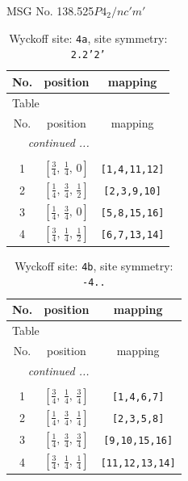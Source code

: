 \documentclass[fleqn,8pt]{jsarticle}
\begin{document}
\setcounter{MaxMatrixCols}{32}

\renewcommand{\tablename}{Table~}
\renewcommand{\figurename}{Figure~}
\begin{center}
\LARGE
MSG No. 138.525\quad$P4_{2}/nc'm'$
\end{center}
\renewcommand{\arraystretch}{1.2}
\begin{longtable}{ccc}
\caption{Wyckoff site: {\tt 4a}, site symmetry: {\tt 2.2'2'}}
 \\
 \hline \hline
No. & position & mapping \\ \hline \endfirsthead

\multicolumn{2}{l}{\tablename\ \thetable{}} \\
 \hline \hline
No. & position & mapping \\ \hline \endhead

 \hline \hline
\multicolumn{2}{r}{\footnotesize\it continued ...} \\ \endfoot

 \hline \hline
\multicolumn{2}{r}{} \\ \endlastfoot

1 & $\left[ \frac{3}{4},\, \frac{1}{4},\, 0 \right]$ & {\tt [1,4,11,12]} \\ \hline
2 & $\left[ \frac{1}{4},\, \frac{3}{4},\, \frac{1}{2} \right]$ & {\tt [2,3,9,10]} \\ \hline
3 & $\left[ \frac{1}{4},\, \frac{3}{4},\, 0 \right]$ & {\tt [5,8,15,16]} \\ \hline
4 & $\left[ \frac{3}{4},\, \frac{1}{4},\, \frac{1}{2} \right]$ & {\tt [6,7,13,14]} \\
\end{longtable}
\renewcommand{\arraystretch}{1.2}
\begin{longtable}{ccc}
\caption{Wyckoff site: {\tt 4b}, site symmetry: {\tt -4..}}
 \\
 \hline \hline
No. & position & mapping \\ \hline \endfirsthead

\multicolumn{2}{l}{\tablename\ \thetable{}} \\
 \hline \hline
No. & position & mapping \\ \hline \endhead

 \hline \hline
\multicolumn{2}{r}{\footnotesize\it continued ...} \\ \endfoot

 \hline \hline
\multicolumn{2}{r}{} \\ \endlastfoot

1 & $\left[ \frac{3}{4},\, \frac{1}{4},\, \frac{3}{4} \right]$ & {\tt [1,4,6,7]} \\ \hline
2 & $\left[ \frac{1}{4},\, \frac{3}{4},\, \frac{1}{4} \right]$ & {\tt [2,3,5,8]} \\ \hline
3 & $\left[ \frac{1}{4},\, \frac{3}{4},\, \frac{3}{4} \right]$ & {\tt [9,10,15,16]} \\ \hline
4 & $\left[ \frac{3}{4},\, \frac{1}{4},\, \frac{1}{4} \right]$ & {\tt [11,12,13,14]} \\
\end{longtable}
\end{document}
